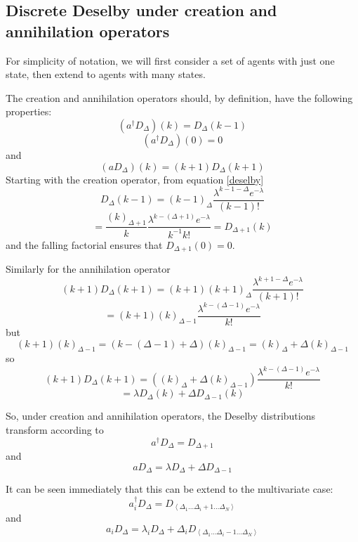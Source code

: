 \documentclass[letterpaper,twocolumn,10pt]{article}
\begin{document}
\subsection{Discrete Deselby under creation and annihilation operators}

For simplicity of notation, we will first consider a set of agents with just one state, then extend to agents with many states.

The creation and annihilation operators should, by definition, have the following properties:
\begin{equation}
(a^\dag D_\Delta)(k) = D_\Delta(k-1)
\label{creation}
\end{equation}
\begin{equation}
(a^\dag D_\Delta)(0) = 0
\end{equation}
and
\begin{equation}
(a D_\Delta)(k) = (k+1)D_\Delta(k+1)
\label{annihilation}
\end{equation}
Starting with the creation operator, from equation \ref{deselby}
\[
D_\Delta(k-1) = (k-1)_{\Delta} \frac{\lambda^{k-1-\Delta} e^{-\lambda}}{(k-1)!} 
\]
\[
= \frac{(k)_{\Delta+1}}{k} \frac{\lambda^{k-(\Delta+1)} e^{-\lambda}}{k^{-1}k!} = D_{\Delta+1}(k)
\]
and the falling factorial ensures that $D_{\Delta+1}(0) = 0$.

Similarly for the annihilation operator
\[
(k+1)D_\Delta(k+1) = (k+1)(k+1)_{\Delta} \frac{\lambda^{k+1-\Delta} e^{-\lambda}}{(k+1)!} 
\]
\[
= (k+1)(k)_{\Delta-1} \frac{\lambda^{k-(\Delta-1)} e^{-\lambda}}{k!} 
\]
but
\[
(k+1)(k)_{\Delta-1} = (k- (\Delta-1) + \Delta)(k)_{\Delta-1} = (k)_\Delta + \Delta(k)_{\Delta-1}
\]
so
\[
(k+1)D_\Delta(k+1) = \left((k)_\Delta + \Delta(k)_{\Delta-1}\right) \frac{\lambda^{k-(\Delta-1)} e^{-\lambda}}{k!}
\]
\[
= \lambda D_\Delta(k) + \Delta D_{\Delta-1}(k)
\]

So, under creation and annihilation operators, the Deselby distributions transform according to
\begin{equation}
a^\dag D_\Delta = D_{\Delta+1}
\end{equation}
and
\begin{equation}
a D_\Delta = \lambda D_\Delta + \Delta D_{\Delta-1}
\end{equation}

It can be seen immediately that this can be extend to the multivariate case:
\begin{equation}
a_i^\dag D_\Delta = D_{\left<\Delta_1...\Delta_i+1...\Delta_N\right>}
\end{equation}
and
\begin{equation}
a_i D_\Delta = \lambda_i D_\Delta + \Delta_i D_{\left<\Delta_1...\Delta_i-1...\Delta_N\right>}
\end{equation}
\end{document}
